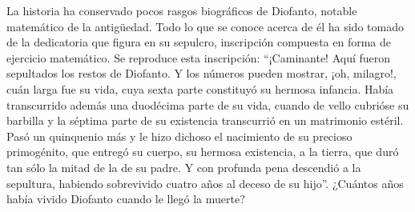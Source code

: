 La historia ha conservado pocos rasgos biográficos de Diofanto, notable matemático de la antigüedad. Todo lo que se conoce acerca de él ha sido tomado de la dedicatoria que figura en su sepulcro, inscripción compuesta en forma de ejercicio matemático. Se reproduce esta inscripción: “¡Caminante! Aquí fueron sepultados los restos de Diofanto. Y los números pueden mostrar, ¡oh, milagro!, cuán larga fue su vida, cuya sexta parte constituyó su hermosa infancia. Había transcurrido además una duodécima parte de su vida, cuando de vello cubrióse su barbilla y la séptima parte de su existencia transcurrió en un matrimonio estéril. Pasó un quinquenio más y le hizo dichoso el nacimiento de su precioso primogénito, que entregó su cuerpo, su hermosa existencia, a la tierra, que duró tan sólo la mitad de la de su padre. Y con profunda pena descendió a la sepultura, habiendo sobrevivido cuatro años al deceso de su hijo”. ¿Cuántos años había vivido Diofanto cuando le llegó la muerte?

